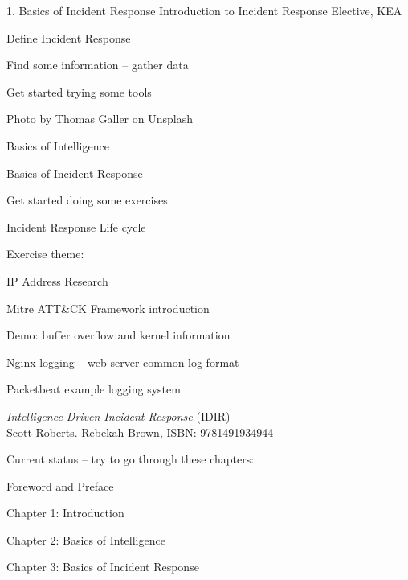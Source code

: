 \documentclass[Screen16to9,17pt]{foils}
\begin{document}
\mytitlepage
{1. Basics of Incident Response}
{Introduction to Incident Response Elective, KEA}




\begin{list2}
\item Define Incident Response
\item Find some information -- gather data
\item Get started trying  some tools
\end{list2}

{\hfill \small Photo by Thomas Galler on Unsplash}


\begin{list2}
\item Basics of Intelligence
\item Basics of Incident Response
\item Get started doing some exercises
\item Incident Response Life cycle
\end{list2}

Exercise theme:
\begin{list2}
\item IP Address Research
\item Mitre ATT\&CK Framework introduction
\item Demo: buffer overflow and kernel information
\item Nginx logging -- web server common log format
\item Packetbeat example logging system
\end{list2}


\emph{Intelligence-Driven Incident Response} (IDIR)\\
 Scott Roberts. Rebekah Brown, ISBN: 9781491934944

Current status -- try to go through these chapters:
\begin{list2}
\item Foreword and Preface
\item Chapter 1: Introduction
\item Chapter 2: Basics of Intelligence
\item Chapter 3: Basics of Incident Response
\end{list2}
\end{document}
